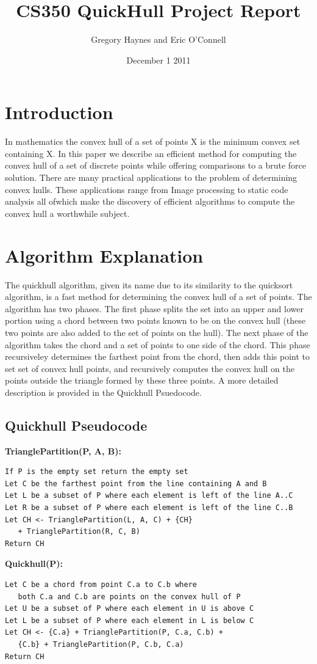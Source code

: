 \documentclass[11pt]{article}
\title{CS350 QuickHull Project Report}
\author{Gregory Haynes and Eric O'Connell}
\date{December 1 2011}
\begin{document}
\maketitle

\section{Introduction}

In mathematics the convex hull of a set of points X is the minimum convex set containing X\cite{Wikipedia:QH}. In this paper we describe an efficient method for computing the convex hull of a set of discrete points while offering comparisons to a brute force solution. There are many practical applications to the problem of determining convex hulls. These applications range from Image processing to static code analysis all ofwhich make the discovery of efficient algorithms to compute the convex hull a worthwhile subject.

\section{Algorithm Explanation}

The quickhull algorithm, given its name due to its similarity to the quicksort algorithm, is a fast method for determining the convex hull of a set of points. The algorithm has two phases. The first phase splits the set into an upper and lower portion using a chord between two points known to be on the convex hull (these two points are also added to the set of points on the hull). The next phase of the algorithm takes the chord and a set of points to one side of the chord. This phase recursiveley determines the farthest point from the chord, then adds this point to set set of convex hull points, and recursively computes the convex hull on the points outside the triangle formed by these three points. A more detailed description is provided in the Quickhull Psuedocode.

\subsection{Quickhull Pseudocode}

\textbf{TrianglePartition(P, A, B):}
\begin{verbatim}
If P is the empty set return the empty set
Let C be the farthest point from the line containing A and B
Let L be a subset of P where each element is left of the line A..C
Let R be a subset of P where each element is left of the line C..B
Let CH <- TrianglePartition(L, A, C) + {CH}
   + TrianglePartition(R, C, B)
Return CH
\end{verbatim}
\textbf{Quickhull(P):}
\begin{verbatim}
Let C be a chord from point C.a to C.b where 
   both C.a and C.b are points on the convex hull of P
Let U be a subset of P where each element in U is above C
Let L be a subset of P where each element in L is below C
Let CH <- {C.a} + TrianglePartition(P, C.a, C.b) + 
   {C.b} + TrianglePartition(P, C.b, C.a)
Return CH
\end{verbatim}
\end{document}
